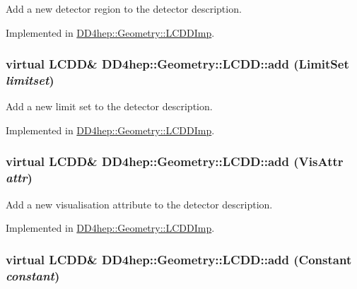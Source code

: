 Add a new detector region to the detector description. 

Implemented in \hyperlink{class_d_d4hep_1_1_geometry_1_1_l_c_d_d_imp_ab8c4f8e119f235e5f050349b19892d47}{DD4hep::Geometry::LCDDImp}.\hypertarget{class_d_d4hep_1_1_geometry_1_1_l_c_d_d_a2b6a8c58332d26518c9def51f1acbc0d}{
\subsubsection[{add}]{\setlength{\rightskip}{0pt plus 5cm}virtual {\bf LCDD}\& DD4hep::Geometry::LCDD::add ({\bf LimitSet} {\em limitset})}}
\label{class_d_d4hep_1_1_geometry_1_1_l_c_d_d_a2b6a8c58332d26518c9def51f1acbc0d}


Add a new limit set to the detector description. 

Implemented in \hyperlink{class_d_d4hep_1_1_geometry_1_1_l_c_d_d_imp_acd0d23dbb73da1b5b16169443f9fb975}{DD4hep::Geometry::LCDDImp}.\hypertarget{class_d_d4hep_1_1_geometry_1_1_l_c_d_d_a4913f783de23fed9eb9dc11678226aa8}{
\subsubsection[{add}]{\setlength{\rightskip}{0pt plus 5cm}virtual {\bf LCDD}\& DD4hep::Geometry::LCDD::add ({\bf VisAttr} {\em attr})}}
\label{class_d_d4hep_1_1_geometry_1_1_l_c_d_d_a4913f783de23fed9eb9dc11678226aa8}


Add a new visualisation attribute to the detector description. 

Implemented in \hyperlink{class_d_d4hep_1_1_geometry_1_1_l_c_d_d_imp_a43d0c83fce1485a129e721f0efa9ea6a}{DD4hep::Geometry::LCDDImp}.\hypertarget{class_d_d4hep_1_1_geometry_1_1_l_c_d_d_a438cd36346d10c381b99bdfaa80ba50e}{
\subsubsection[{add}]{\setlength{\rightskip}{0pt plus 5cm}virtual {\bf LCDD}\& DD4hep::Geometry::LCDD::add ({\bf Constant} {\em constant})}}
\label{class_d_d4hep_1_1_geometry_1_1_l_c_d_d_a438cd36346d10c381b99bdfaa80ba50e}



